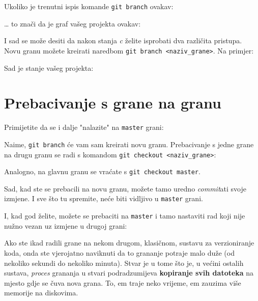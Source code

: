 Ukoliko je trenutni ispis komande \verb+git branch+ ovakav:



\dots{} to znači da je graf vašeg projekta ovakav:



I sad se može desiti da nakon stanja \emph c želite isprobati dva različita pristupa.
Novu granu možete kreirati naredbom \verb+git branch <naziv_grane>+.
Na primjer:


Sad je stanje vašeg projekta:



\section*{Prebacivanje s grane na granu}

Primijetite da se i dalje "nalazite" na \verb+master+ grani:



Naime, \verb+git branch+ će vam sam kreirati novu granu.
Prebacivanje s jedne grane na drugu granu se radi s komandom \verb+git checkout <naziv_grane>+:



Analogno, na glavnu granu se vraćate s \verb+git checkout master+.

Sad, kad ste se prebacili na novu granu, možete tamo uredno \emph{commit}ati svoje izmjene. 
I sve što tu spremite, neće biti vidljivo u \verb+master+ grani.



I, kad god želite, možete se prebaciti na \verb+master+ i tamo nastaviti rad koji nije nužno vezan uz izmjene u drugoj grani:



Ako ste ikad radili grane na nekom drugom, klasičnom, sustavu za verzioniranje koda, onda ste vjerojatno naviknuti da to grananje potraje malo duže (od nekoliko sekundi do nekoliko minuta).
Stvar je u tome što je, u većini ostalih sustava, \emph{proces} grananja u stvari podradzumijeva \textbf{kopiranje svih datoteka} na mjesto gdje se čuva nova grana.
To, em traje neko vrijeme, em zauzima više memorije na diskovima.

